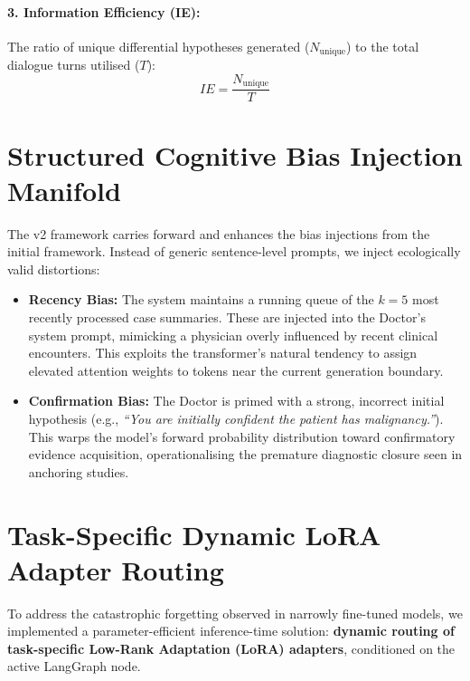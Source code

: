 \paragraph{3. Information Efficiency (IE):} The ratio of unique differential hypotheses generated ($N_{\text{unique}}$) to the total dialogue turns utilised ($T$):
\begin{equation}
IE = \frac{N_{\text{unique}}}{T}
\end{equation}

\section{Structured Cognitive Bias Injection Manifold}

The v2 framework carries forward and enhances the bias injections from the initial framework. Instead of generic sentence-level prompts, we inject ecologically valid distortions:

\begin{itemize}
    \item \textbf{Recency Bias:} The system maintains a running queue of the $k=5$ most recently processed case summaries. These are injected into the Doctor's system prompt, mimicking a physician overly influenced by recent clinical encounters. This exploits the transformer's natural tendency to assign elevated attention weights to tokens near the current generation boundary.
    \item \textbf{Confirmation Bias:} The Doctor is primed with a strong, incorrect initial hypothesis (e.g., \textit{``You are initially confident the patient has malignancy.''}). This warps the model's forward probability distribution toward confirmatory evidence acquisition, operationalising the premature diagnostic closure seen in anchoring studies.
\end{itemize}

\section{Task-Specific Dynamic LoRA Adapter Routing}

To address the catastrophic forgetting observed in narrowly fine-tuned models, we implemented a parameter-efficient inference-time solution: \textbf{dynamic routing of task-specific Low-Rank Adaptation (LoRA) adapters}, conditioned on the active LangGraph node.

